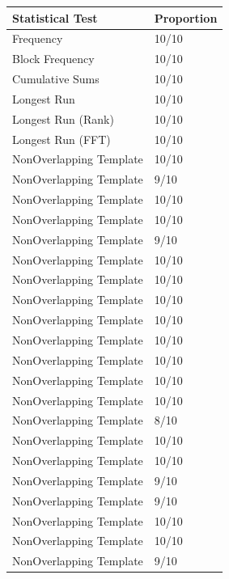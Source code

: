 \documentclass[letterpaper, 11 pt]{article}
\begin{document}
\begin{table}[H]
    \centering
\begin{tabular}{|l|l|}
\hline
\textbf{Statistical Test}          & \textbf{Proportion} \\\hline
Frequency                 & 10/10      \\\hline
Block Frequency           & 10/10      \\\hline
Cumulative Sums           & 10/10      \\\hline
Longest Run               & 10/10      \\\hline
Longest Run (Rank)        & 10/10      \\\hline
Longest Run (FFT)         & 10/10      \\\hline
NonOverlapping Template   & 10/10      \\\hline
NonOverlapping Template   & 9/10       \\\hline
NonOverlapping Template   & 10/10      \\\hline
NonOverlapping Template   & 10/10      \\\hline
NonOverlapping Template   & 9/10       \\\hline
NonOverlapping Template   & 10/10      \\\hline
NonOverlapping Template   & 10/10      \\\hline
NonOverlapping Template   & 10/10      \\\hline
NonOverlapping Template   & 10/10      \\\hline
NonOverlapping Template   & 10/10      \\\hline
NonOverlapping Template   & 10/10      \\\hline
NonOverlapping Template   & 10/10      \\\hline
NonOverlapping Template   & 10/10      \\\hline
NonOverlapping Template   & 8/10      \\\hline
NonOverlapping Template   & 10/10      \\\hline
NonOverlapping Template   & 10/10      \\\hline
NonOverlapping Template   & 9/10      \\\hline
NonOverlapping Template   & 9/10      \\\hline
NonOverlapping Template   & 10/10      \\\hline
NonOverlapping Template   & 10/10      \\\hline
NonOverlapping Template   & 9/10      \\\hline

\end{tabular}
\end{table}
\end{document}
